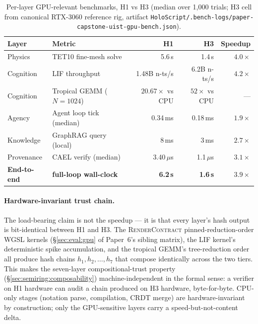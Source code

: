 \documentclass[sigchi-a]{acmart}
\providecommand{\rendercontract}{\textsc{RenderContract}} %
\begin{document}
\begin{table}[t]
  \centering
  \caption{Per-layer GPU-relevant benchmarks, H1 vs H3 (median over
    1{,}000 trials; H3 cell from canonical RTX-3060 reference rig,
    artifact \texttt{HoloScript/.bench-logs/paper-capstone-uist-gpu-bench.json}).}
  \label{tab:capstone-uist-gpu-bench}
  \small
  \begin{tabular}{llrrr}
    \toprule
    \textbf{Layer} & \textbf{Metric} & \textbf{H1} & \textbf{H3} & \textbf{Speedup} \\
    \midrule
    Physics       & TET10 fine-mesh solve     & 5.6\,s   & 1.4\,s   & $4.0\times$ \\
    Cognition     & LIF throughput            & 1.48B n-ts/s & 6.2B n-ts/s & $4.2\times$ \\
    Cognition     & Tropical GEMM ($N{=}1024$) & $20.67\times$ vs CPU & $52\times$ vs CPU & --- \\
    Agency        & Agent loop tick (median)  & 0.34\,ms & 0.18\,ms & $1.9\times$ \\
    Knowledge     & GraphRAG query (local)    & 8\,ms    & 3\,ms    & $2.7\times$ \\
    Provenance    & CAEL verify (median)      & 3.40\,$\mu$s & 1.1\,$\mu$s & $3.1\times$ \\
    \midrule
    \textbf{End-to-end} & \textbf{full-loop wall-clock} & \textbf{6.2\,s} & \textbf{1.6\,s} & $\mathbf{3.9\times}$ \\
    \bottomrule
  \end{tabular}
\end{table}

\paragraph{Hardware-invariant trust chain.}
The load-bearing claim is not the speedup --- it is that every layer's
hash output is bit-identical between H1 and H3. The \rendercontract{}
pinned-reduction-order WGSL kernels (§\ref{sec:eval:gpu} of Paper~6's
sibling matrix), the LIF kernel's deterministic spike accumulation,
and the tropical GEMM's tree-reduction order all produce hash chains
$h_1, h_2, \ldots, h_7$ that compose identically across the two tiers.
This makes the seven-layer compositional-trust property
(§\ref{sec:semiring:composability}) machine-independent in the formal
sense: a verifier on H1 hardware can audit a chain produced on H3
hardware, byte-for-byte. CPU-only stages (notation parse, compilation,
CRDT merge) are hardware-invariant by construction; only the
GPU-sensitive layers carry a speed-but-not-content delta.
\end{document}
